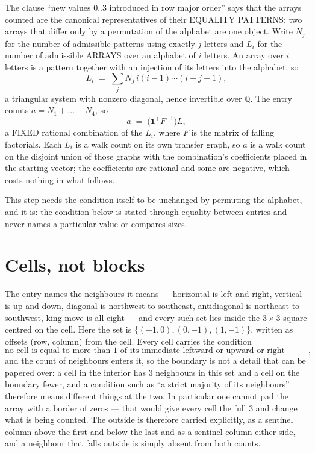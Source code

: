\documentclass[11pt,a4paper]{article}
\theoremstyle{plain}
\theoremstyle{definition}
\begin{document}
The clause ``new values $0..3$ introduced in row major order'' says that the arrays
counted are the canonical representatives of their EQUALITY PATTERNS: two arrays that differ
only by a permutation of the alphabet are one object. Write $N_j$ for the number of admissible
patterns using exactly $j$ letters and $L_i$ for the number of admissible ARRAYS over an
alphabet of $i$ letters. An array over $i$ letters is a pattern together with an injection of
its letters into the alphabet, so
\[
L_i\;=\;\sum_{j}N_j\,i(i-1)\cdots(i-j+1),
\]
a triangular system with nonzero diagonal, hence invertible over $\mathbb{Q}$. The entry
counts $a=N_1+\dots+N_{4}$, so
\[
a\;=\;\bigl(\mathbf{1}^{\!\top}F^{-1}\bigr)L ,
\]
a FIXED rational combination of the $L_i$, where $F$ is the matrix of falling factorials.
Each $L_i$ is a walk count on its own transfer graph, so $a$ is a walk count on the disjoint
union of those graphs with the combination's coefficients placed in the starting vector; the
coefficients are rational and some are negative, which costs nothing in what follows.

This step needs the condition itself to be unchanged by permuting the alphabet, and it is:
the condition below is stated through equality between entries and never names a particular
value or compares sizes.

\section{Cells, not blocks}

The entry names the neighbours it means --- horizontal is left and right, vertical is up and
down, diagonal is northwest-to-southeast, antidiagonal is northeast-to-southwest, king-move is
all eight --- and every such set lies inside the $3\times3$ square centred on the cell. Here
the set is $\{(-1,0), (0,-1), (1,-1)\}$, written as offsets (row, column) from the cell. Every cell carries
the condition
\[
\text{no cell is equal to more than 1 of its immediate leftward or upward or right-upward antidiagonal neighbours},
\]
and the count of neighbours enters it, so the boundary is not a detail that can be papered
over: a cell in the interior has $3$ neighbours in this set and a cell on the boundary
fewer, and a condition such as ``a strict majority of its neighbours'' therefore means
different things at the two. In particular one cannot pad the array with a border of zeros ---
that would give every cell the full $3$ and change what is being counted. The outside is
therefore carried
explicitly, as a sentinel column above the first and below the last and as a sentinel column
either side, and a neighbour that falls outside is simply absent from both counts.
\end{document}
